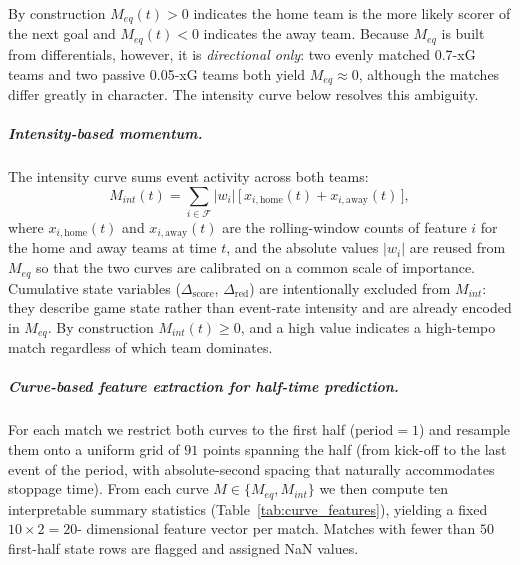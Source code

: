 \documentclass[pdflatex,sn-mathphys-num]{sn-jnl}
\theoremstyle{thmstyleone}
\theoremstyle{thmstyletwo}
\theoremstyle{thmstylethree}
\begin{document}
By construction $M_{eq}(t) > 0$ indicates the home team is the more
likely scorer of the next goal and $M_{eq}(t) < 0$ indicates the away
team. Because $M_{eq}$ is built from differentials, however, it is
\emph{directional only}: two evenly matched 0.7-xG teams and two passive
0.05-xG teams both yield $M_{eq}\!\approx 0$, although the matches
differ greatly in character. The intensity curve below resolves this
ambiguity.

\subparagraph{Intensity-based momentum.}
The intensity curve sums event activity across both teams:
\begin{equation}
M_{int}(t) = \sum_{i \in \mathcal{F}} |w_i|\,
             \bigl[\,x_{i,\text{home}}(t) + x_{i,\text{away}}(t)\,\bigr],
\label{eq:momentum_int}
\end{equation}
where $x_{i,\text{home}}(t)$ and $x_{i,\text{away}}(t)$ are the
rolling-window counts of feature $i$ for the home and away teams at
time $t$, and the absolute values $|w_i|$ are reused from $M_{eq}$ so
that the two curves are calibrated on a common scale of importance.
Cumulative state variables ($\Delta_{\text{score}}$,
$\Delta_{\text{red}}$) are intentionally excluded from $M_{int}$: they
describe game state rather than event-rate intensity and are already
encoded in $M_{eq}$. By construction $M_{int}(t) \ge 0$, and a high
value indicates a high-tempo match regardless of which team dominates.

\subparagraph{Curve-based feature extraction for half-time prediction.}
For each match we restrict both curves to the first half
($\text{period}=1$) and resample them onto a uniform grid of $91$ points
spanning the half (from kick-off to the last event of the period, with
absolute-second spacing that naturally accommodates stoppage time).
From each curve $M \in \{M_{eq}, M_{int}\}$ we then compute ten
interpretable summary statistics
(Table~\ref{tab:curve_features}), yielding a fixed $10 \times 2 = 20$-
dimensional feature vector per match. Matches with fewer than $50$
first-half state rows are flagged and assigned NaN values.
\end{document}
